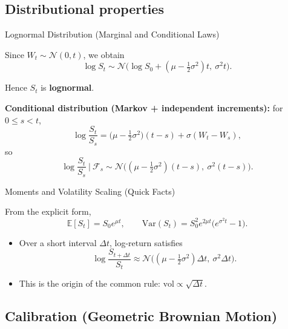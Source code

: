 \documentclass[10pt,aspectratio=169]{beamer}
\begin{document}
\subsection{Distributional properties}

\begin{frame}{Lognormal Distribution (Marginal and Conditional Laws)}

Since \(W_t\sim\mathcal N(0,t)\), we obtain\pause
\[
\log S_t \sim \mathcal N\!\Big(
\log S_0 + (\mu-\tfrac12\sigma^2)t,\ \sigma^2 t
\Big).
\]\pause

Hence \(S_t\) is \textbf{lognormal}.\pause

\medskip
\textbf{Conditional distribution (Markov + independent increments):}\pause\;
for \(0\le s<t\),
\[
\log\frac{S_t}{S_s}
=
\Big(\mu-\tfrac12\sigma^2\Big)(t-s)
+
\sigma (W_t-W_s),
\]
so\pause
\[
\log\frac{S_t}{S_s}\ \Big|\ \mathcal F_s
\sim
\mathcal N\!\Big(
(\mu-\tfrac12\sigma^2)(t-s),\ \sigma^2(t-s)
\Big).
\]

\end{frame}

\begin{frame}{Moments and Volatility Scaling (Quick Facts)}

From the explicit form,\pause
\[
\mathbb E[S_t]
=
S_0 e^{\mu t},
\qquad
\mathrm{Var}(S_t)
=
S_0^2 e^{2\mu t}\big(e^{\sigma^2 t}-1\big).
\]\pause

\begin{itemize}
  \item Over a short interval \(\Delta t\), log-return satisfies\pause
  \[
  \log\frac{S_{t+\Delta t}}{S_t}
  \approx
  \mathcal N\!\Big((\mu-\tfrac12\sigma^2)\Delta t,\ \sigma^2\Delta t\Big).
  \]\pause
  \item This is the origin of the common rule: \(\text{vol} \propto \sqrt{\Delta t}\).
\end{itemize}

\end{frame}

\subsection{Calibration (Geometric Brownian Motion)}
\end{document}
